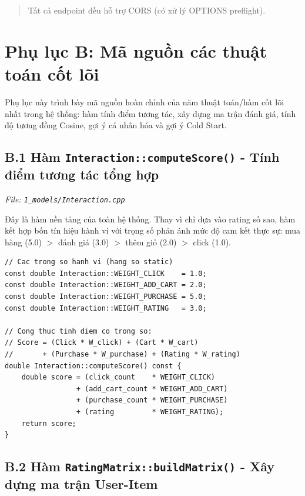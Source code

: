 \documentclass{report}
\begin{document}
\begin{quote}
Tất cả endpoint đều hỗ trợ CORS (có xử lý OPTIONS preflight).
\end{quote}

\chapter*{Phụ lục B: Mã nguồn các thuật toán cốt lõi}
\label{app:sourcecode}

Phụ lục này trình bày mã nguồn hoàn chỉnh của năm thuật toán/hàm cốt lõi nhất trong hệ thống: hàm tính điểm tương tác, xây dựng ma trận đánh giá, tính độ tương đồng Cosine, gợi ý cá nhân hóa và gợi ý Cold Start.

\section*{B.1 Hàm \texttt{Interaction::computeScore()} - Tính điểm tương tác tổng hợp}

\textit{File: \texttt{1\_models/Interaction.cpp}}

Đây là hàm nền tảng của toàn hệ thống. Thay vì chỉ dựa vào rating số sao, hàm kết hợp bốn tín hiệu hành vi với trọng số phản ánh mức độ cam kết thực sự: mua hàng (5.0) $>$ đánh giá (3.0) $>$ thêm giỏ (2.0) $>$ click (1.0).

\begin{lstlisting}[caption={Hàm computeScore() - File 1\_models/Interaction.cpp}, label={lst:compute_score}]
// Cac trong so hanh vi (hang so static)
const double Interaction::WEIGHT_CLICK    = 1.0;
const double Interaction::WEIGHT_ADD_CART = 2.0;
const double Interaction::WEIGHT_PURCHASE = 5.0;
const double Interaction::WEIGHT_RATING   = 3.0;

// Cong thuc tinh diem co trong so:
// Score = (Click * W_click) + (Cart * W_cart)
//       + (Purchase * W_purchase) + (Rating * W_rating)
double Interaction::computeScore() const {
    double score = (click_count    * WEIGHT_CLICK)
                 + (add_cart_count * WEIGHT_ADD_CART)
                 + (purchase_count * WEIGHT_PURCHASE)
                 + (rating         * WEIGHT_RATING);
    return score;
}
\end{lstlisting}

\section*{B.2 Hàm \texttt{RatingMatrix::buildMatrix()} - Xây dựng ma trận User-Item}
\end{document}
